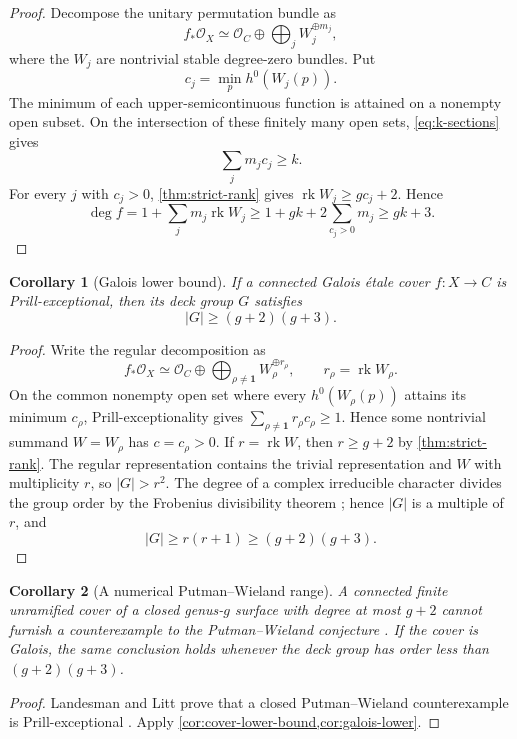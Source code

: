 \documentclass[11pt,reqno]{amsart}
\numberwithin{equation}{section}
\newtheorem{corollary}[corollary]{Corollary}
\theoremstyle{remark}
\DeclareMathOperator{\rk}{rk}
\newcommand{\cO}{\mathcal O}
\begin{document}
\begin{proof}
Decompose the unitary permutation bundle as
\[
 f_*\cO_X\simeq
 \cO_C\oplus\bigoplus_j W_j^{\oplus m_j},
\tag{6.15}\label{eq:permutation-decomp}
\]
where the \(W_j\) are nontrivial stable degree-zero bundles.  Put
\[
 c_j=\min_p h^0(W_j(p)).
\]
The minimum of each upper-semicontinuous function is attained on a
nonempty open subset.  On the intersection of these finitely many open
sets, \eqref{eq:k-sections} gives
\[
 \sum_jm_jc_j\geq k.
\]
For every \(j\) with \(c_j>0\), \cref{thm:strict-rank} gives
\(\rk W_j\geq gc_j+2\).  Hence
\[
 \deg f
 =1+\sum_jm_j\rk W_j
 \geq1+gk+2\sum_{c_j>0}m_j
 \geq gk+3.
\]
\end{proof}

\begin{corollary}[Galois lower bound]\label{cor:galois-lower}
If a connected Galois \'etale cover \(f\colon X\to C\) is
Prill-exceptional, then its deck group \(G\) satisfies
\[
 |G|\geq(g+2)(g+3).
\tag{6.16}\label{eq:galois-order-lower}
\]
\end{corollary}

\begin{proof}
Write the regular decomposition as
\[
 f_*\cO_X\simeq\cO_C\oplus
 \bigoplus_{\rho\neq\mathbf1}W_\rho^{\oplus r_\rho},
 \qquad r_\rho=\rk W_\rho.
\]
On the common nonempty open set where every
\(h^0(W_\rho(p))\) attains its minimum \(c_\rho\),
Prill-exceptionality gives
\(\sum_{\rho\neq\mathbf1}r_\rho c_\rho\geq1\).  Hence some nontrivial
summand \(W=W_\rho\) has \(c=c_\rho>0\).  If \(r=\rk W\), then
\(r\geq g+2\) by \cref{thm:strict-rank}.  The regular representation
contains the trivial representation and \(W\) with multiplicity \(r\),
so \(|G|>r^2\).  The degree of a complex irreducible character divides
the group order by the Frobenius divisibility theorem
\cite[\S6.5]{SerreFiniteGroups}; hence \(|G|\) is a
multiple of \(r\), and
\[
 |G|\geq r(r+1)\geq(g+2)(g+3).
\]
\end{proof}

\begin{corollary}[A numerical Putman--Wieland range]\label{cor:PW-range}
A connected finite unramified cover of a closed genus-\(g\) surface with
degree at most \(g+2\) cannot furnish a counterexample to the
Putman--Wieland conjecture \cite{PutmanWieland}.  If the cover is Galois, the same conclusion
holds whenever the deck group has order less than \((g+2)(g+3)\).
\end{corollary}

\begin{proof}
Landesman and Litt prove that a closed Putman--Wieland counterexample is
Prill-exceptional \cite[Lemma 5.5]{LandesmanLittApplications}.  Apply
\cref{cor:cover-lower-bound,cor:galois-lower}.
\end{proof}
\end{document}
